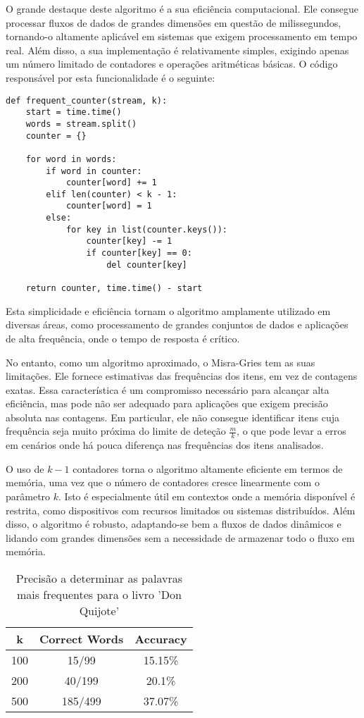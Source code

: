 \documentclass[shortpaper, portugues, times, mirror]{revdetua}
\begin{document}
O grande destaque deste algoritmo é a sua eficiência computacional. Ele consegue processar fluxos de dados de grandes dimensões em questão de milissegundos, tornando-o altamente aplicável em sistemas que exigem processamento em tempo real. Além disso, a sua implementação é relativamente simples, exigindo apenas um número limitado de contadores e operações aritméticas básicas. O código responsável por esta funcionalidade é o seguinte:
\begin{lstlisting}
def frequent_counter(stream, k):
    start = time.time()
    words = stream.split()
    counter = {}

    for word in words:
        if word in counter:
            counter[word] += 1
        elif len(counter) < k - 1:
            counter[word] = 1
        else:
            for key in list(counter.keys()):
                counter[key] -= 1
                if counter[key] == 0:
                    del counter[key]

    return counter, time.time() - start
\end{lstlisting}

Esta simplicidade e eficiência tornam o algoritmo amplamente utilizado em diversas áreas, como processamento de grandes conjuntos de dados e aplicações de alta frequência, onde o tempo de resposta é crítico.

No entanto, como um algoritmo aproximado, o Misra-Gries tem as suas limitações. Ele fornece estimativas das frequências dos itens, em vez de contagens exatas. Essa característica é um compromisso necessário para alcançar alta eficiência, mas pode não ser adequado para aplicações que exigem precisão absoluta nas contagens. Em particular, ele não consegue identificar itens cuja frequência seja muito próxima do limite de deteção \(\frac{m}{k}\), o que pode levar a erros em cenários onde há pouca diferença nas frequências dos itens analisados.

O uso de \(k-1\) contadores torna o algoritmo altamente eficiente em termos de memória, uma vez que o número de contadores cresce linearmente com o parâmetro \(k\). Isto é especialmente útil em contextos onde a memória disponível é restrita, como dispositivos com recursos limitados ou sistemas distribuídos. Além disso, o algoritmo é robusto, adaptando-se bem a fluxos de dados dinâmicos e lidando com grandes dimensões sem a necessidade de armazenar todo o fluxo em memória.

\begin{table}[H]
\centering
\begin{tabular}{|c|c|c|}
\hline
\textbf{k} & \textbf{Correct Words} & \textbf{Accuracy} \\ \hline
100 & 15/99 & 15.15\% \\ \hline
200 & 40/199 & 20.1\% \\ \hline
500 & 185/499 & 37.07\% \\ \hline
\end{tabular}
\caption{Precisão a determinar as palavras mais frequentes para o livro 'Don Quijote'}
\label{tab:accuracy}
\end{table}
\end{document}
